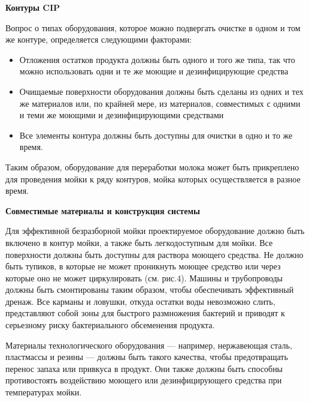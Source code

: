 \documentclass[a4paper,12pt,oneside]{extarticle}
\begin{document}
 \begin{flushleft}
	\bfseries 	Контуры CIP
\end{flushleft}	

\begin{flushleft}
	Вопрос о типах оборудования, которое можно подвергать очистке в одном и том же контуре, определяется следующими факторами:
\end{flushleft}
 
 \begin{itemize}
 	\item Отложения остатков продукта должны быть одного и того же типа, так что можно использовать одни и те же моющие и дезинфицирующие средства
 	\item Очищаемые поверхности оборудования должны быть сделаны из одних и тех же материалов или, по крайней мере, из материалов, совместимых с одними и теми же моющими и дезинфицирующими средствами
 	\item Все элементы контура должны быть доступны для очистки в одно и то же время.
 \end{itemize}
 
 \begin{flushleft}
 	Таким образом, оборудование для переработки молока может быть прикреплено для проведения мойки к ряду контуров, мойка которых осуществляется в разное время.
 \end{flushleft}
 
\begin{flushleft}
	\bfseries 	Совместимые материалы и конструкция системы
\end{flushleft}	

\begin{flushleft}
		Для эффективной безразборной мойки проектируемое оборудование должно быть включено в контур мойки, а также быть легкодоступным для мойки. Все поверхности должны быть доступны для раствора моющего средства. Не должно быть тупиков, в которые не может проникнуть моющее средство или через которые оно не может циркулировать (см. рис.4). Машины и трубопроводы должны быть смонтированы таким образом, чтобы обеспечивать эффективный дренаж. Все карманы и ловушки, откуда остатки воды невозможно слить, представляют собой зоны для быстрого размножения бактерий и приводят к серьезному риску бактериального обсеменения продукта.
\end{flushleft}
 
\begin{flushleft}
Материалы технологического оборудования — например, нержавеющая сталь, пластмассы и резины — должны быть такого качества, чтобы предотвращать перенос запаха или привкуса в продукт. Они также должны быть способны противостоять воздействию моющего или дезинфицирующего средства при температурах мойки.
\end{flushleft}	
\end{document}
